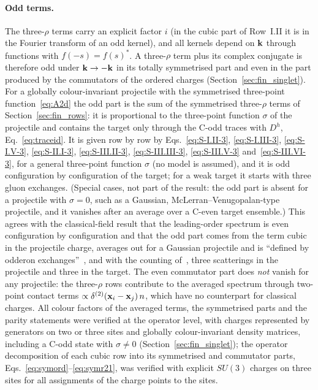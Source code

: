 \paragraph{Odd terms.} The three-$\rho$ terms carry an explicit factor $i$ (in the cubic part of Row~I.II it is in the Fourier transform of an odd kernel), and all kernels depend on $\mathbf{k}$ through functions with $f(-s)=f(s)^*$. A three-$\rho$ term plus its complex conjugate is therefore odd under $\mathbf{k}\to-\mathbf{k}$ in its totally symmetrised part and even in the part produced by the commutators of the ordered charges (Section~\ref{sec:fin_singlet}). For a globally colour-invariant projectile with the symmetrised three-point function~\eqref{eq:A2d} the odd part is the sum of the symmetrised three-$\rho$ terms of Section~\ref{sec:fin_rows}: it is proportional to the three-point function $\sigma$ of the projectile and contains the target only through the C-odd traces with $D^h$, Eq.~\eqref{eq:traceid}. It is given row by row by Eqs.~\eqref{eq:S-I.II-3}, \eqref{eq:S-I.III-3}, \eqref{eq:S-I.V-3}, \eqref{eq:S-II.I-3}, \eqref{eq:S-III.II-3}, \eqref{eq:S-III.III-3}, \eqref{eq:S-III.V-3} and~\eqref{eq:S-III.VI-3}, for a general three-point function $\sigma$ (no model is assumed), and it is odd configuration by configuration of the target; for a weak target it starts with three gluon exchanges. (Special cases, not part of the result: the odd part is absent for a projectile with $\sigma=0$, such as a Gaussian, McLerran--Venugopalan-type projectile, and it vanishes after an average over a C-even target ensemble.) This agrees with the classical-field result that the leading-order spectrum is even configuration by configuration and that the odd part comes from the term cubic in the projectile charge, averages out for a Gaussian projectile and is ``defined by odderon exchanges''~\cite{McLerran:2016snu}, and with the counting of~\cite{Kovchegov:2018jun}, three scatterings in the projectile and three in the target. The even commutator part does \emph{not} vanish for any projectile: the three-$\rho$ rows contribute to the averaged spectrum through two-point contact terms $\propto\delta^{(2)}(\mathbf{x}_i-\mathbf{x}_j)\,n$, which have no counterpart for classical charges. All colour factors of the averaged terms, the symmetrised parts and the parity statements were verified at the operator level, with charges represented by generators on two or three sites and globally colour-invariant density matrices, including a C-odd state with $\sigma\neq0$ (Section~\ref{sec:fin_singlet}); the operator decomposition of each cubic row into its symmetrised and commutator parts, Eqs.~\eqref{eq:symord}--\eqref{eq:symr21}, was verified with explicit $SU(3)$ charges on three sites for all assignments of the charge points to the sites.

